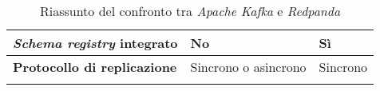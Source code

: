 \begin{longtable}{|>{\centering\arraybackslash}p{}|>{\centering\arraybackslash}p{}|>{\centering\arraybackslash}p{}|}
	\hline
	\textbf{\textit{Schema registry} integrato} & No                                                                                                                                                          & Sì                                                                                                                                                                     \\
	\hline
	\textbf{Protocollo di replicazione}         & Sincrono o asincrono                                                                                                                                        & Sincrono                                                                                                                                                               \\
	\hline
	\caption{Riassunto del confronto tra \textit{Apache Kafka} e \textit{Redpanda}}
	\label{table:2}
\end{longtable}


















